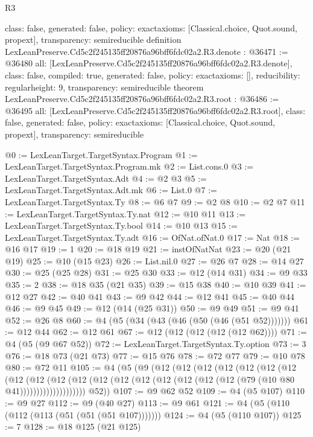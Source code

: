 \begin{lexlean}{R3}
\begin{coremodule}
{  class: false,
  generated: false,
  policy: exact{axioms: [Classical.choice, Quot.sound, propext]},
  transparency: semireducible
}
definition LexLeanPreserve.Cd5c2f245135ff20876a96bff6fdc02a2.R3.denote : @36471 := @36480 {
  all: [LexLeanPreserve.Cd5c2f245135ff20876a96bff6fdc02a2.R3.denote],
  class: false,
  compiled: true,
  generated: false,
  policy: exact{axioms: []},
  reducibility: regular{height: 9},
  transparency: semireducible
}
theorem LexLeanPreserve.Cd5c2f245135ff20876a96bff6fdc02a2.R3.root : @36486 := @36495 {
  all: [LexLeanPreserve.Cd5c2f245135ff20876a96bff6fdc02a2.R3.root],
  class: false,
  generated: false,
  policy: exact{axioms: [Classical.choice, Quot.sound, propext]},
  transparency: semireducible
}

@0 := LexLeanTarget.TargetSyntax.Program
@1 := LexLeanTarget.TargetSyntax.Program.mk
@2 := List.cons.{0}
@3 := LexLeanTarget.TargetSyntax.Adt
@4 := @2 @3
@5 := LexLeanTarget.TargetSyntax.Adt.mk
@6 := List.{0}
@7 := LexLeanTarget.TargetSyntax.Ty
@8 := @6 @7
@9 := @2 @8
@10 := @2 @7
@11 := LexLeanTarget.TargetSyntax.Ty.nat
@12 := @10 @11
@13 := LexLeanTarget.TargetSyntax.Ty.bool
@14 := @10 @13
@15 := LexLeanTarget.TargetSyntax.Ty.adt
@16 := OfNat.ofNat.{0}
@17 := Nat
@18 := @16 @17
@19 := 1
@20 := @18 @19
@21 := instOfNatNat
@23 := @20 (@21 @19)
@25 := @10 (@15 @23)
@26 := List.nil.{0}
@27 := @26 @7
@28 := @14 @27
@30 := @25 (@25 @28)
@31 := @25 @30
@33 := @12 (@14 @31)
@34 := @9 @33
@35 := 2
@38 := @18 @35 (@21 @35)
@39 := @15 @38
@40 := @10 @39
@41 := @12 @27
@42 := @40 @41
@43 := @9 @42
@44 := @12 @41
@45 := @40 @44
@46 := @9 @45
@49 := @12 (@14 (@25 @31))
@50 := @9 @49
@51 := @9 @41
@52 := @26 @8
@60 := @4 (@5 (@34 (@43 (@46 (@50 (@46 (@51 @52)))))))
@61 := @12 @44
@62 := @12 @61
@67 := @12 (@12 (@12 (@12 (@12 @62))))
@71 := @4 (@5 (@9 @67 @52))
@72 := LexLeanTarget.TargetSyntax.Ty.option
@73 := 3
@76 := @18 @73 (@21 @73)
@77 := @15 @76
@78 := @72 @77
@79 := @10 @78
@80 := @72 @11
@105 := @4
    (@5
      (@9
        (@12
          (@12
            (@12
              (@12
                (@12
                  (@12
                    (@12
                      (@12
                        (@12
                          (@12
                            (@12
                              (@12
                                (@12 (@12 (@12 (@12 (@12 (@12 (@79 (@10 @80 @41))))))))))))))))))))
        @52))
@107 := @9 @62 @52
@109 := @4 (@5 @107)
@110 := @9 @27
@112 := @9 (@40 @27)
@113 := @9 @61
@121 := @4 (@5 (@110 (@112 (@113 (@51 (@51 (@51 @107)))))))
@124 := @4 (@5 (@110 @107))
@125 := 7
@128 := @18 @125 (@21 @125)

\end{coremodule}
\end{lexlean}
